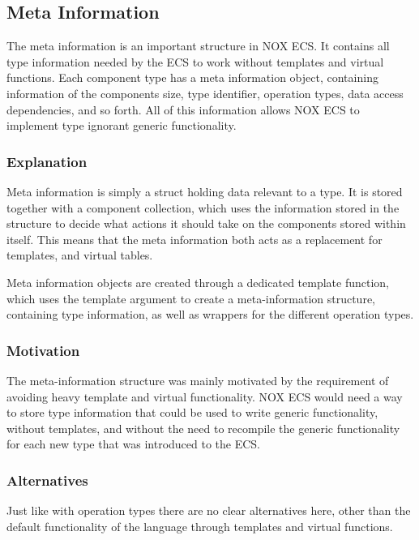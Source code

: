 \subsection{Meta Information}
\label{subsec:detailed_meta_information}
The meta information is an important structure in NOX ECS.
It contains all type information needed by the ECS to work without templates and virtual functions.
Each component type has a meta information object, containing information of the components size, type identifier, operation types, data access dependencies, and so forth.
All of this information allows NOX ECS to implement type ignorant generic functionality.

\subsubsection{Explanation}
Meta information is simply a struct holding data relevant to a type.
It is stored together with a component collection, which uses the information stored in the structure to decide what actions it should take on the components stored within itself.
This means that the meta information both acts as a replacement for templates, and virtual tables.

Meta information objects are created through a dedicated template function, which uses the template argument to create a meta-information structure, containing type information, as well as wrappers for the different operation types.

\subsubsection{Motivation}
The meta-information structure was mainly motivated by the requirement of avoiding heavy template and virtual functionality.
NOX ECS would need a way to store type information that could be used to write generic functionality, without templates, and without the need to recompile the generic functionality for each new type that was introduced to the ECS.

\subsubsection{Alternatives}
Just like with operation types there are no clear alternatives here, other than
the default functionality of the language through templates and virtual functions.

